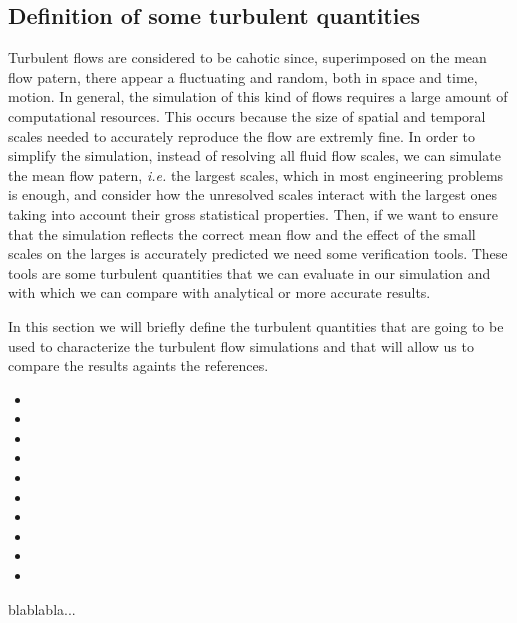 \subsection{Definition of some turbulent quantities}
Turbulent flows are considered to be cahotic since, superimposed on the mean flow patern, there appear a fluctuating and random, both in space and time, motion. In general, the simulation of this kind of flows requires a large amount of computational resources. This occurs because the size of spatial and temporal scales needed to accurately reproduce the flow are extremly fine. In order to simplify the simulation, instead of resolving all fluid flow scales, we can simulate the mean flow patern, \textit{i.e.} the largest scales, which in most engineering problems is enough, and consider how the unresolved scales interact with the largest ones taking into account their gross statistical properties. Then, if we want to ensure that the simulation reflects the correct mean flow and the effect of the small scales on the larges is accurately predicted we need some verification tools. These tools are some turbulent quantities that we can evaluate in our simulation and with which we can compare with analytical or more accurate results.

In this section we will briefly define the turbulent quantities that are going to be used to characterize the turbulent flow simulations and that will allow us to compare the results againts the references.

\begin{itemize}
\item{}
\item{}
\item{}
\item{}
\item{}
\item{}
\item{}
\item{}
\item{}
\item{}
\end{itemize}

blablabla...
